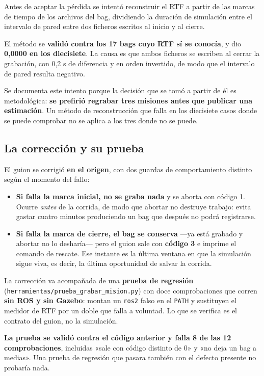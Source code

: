 \documentclass[12pt,letterpaper]{article}
\begin{document}
Antes de aceptar la pérdida se intentó reconstruir el RTF a partir de las marcas de tiempo de los archivos del bag, dividiendo la duración de simulación entre el intervalo de pared entre dos ficheros escritos al inicio y al cierre.

El método se \textbf{validó contra los 17 bags cuyo RTF sí se conocía}, y dio \textbf{0,0000 en los diecisiete}. La causa es que ambos ficheros se escriben al cerrar la grabación, con 0,2 s de diferencia y en orden invertido, de modo que el intervalo de pared resulta negativo.

Se documenta este intento porque la decisión que se tomó a partir de él es metodológica: \textbf{se prefirió regrabar tres misiones antes que publicar una estimación}. Un método de reconstrucción que falla en los diecisiete casos donde se puede comprobar no se aplica a los tres donde no se puede.

\subsection{La corrección y su prueba}

El guion se corrigió \textbf{en el origen}, con dos guardas de comportamiento distinto según el momento del fallo:

\begin{itemize}[leftmargin=*]
    \item \textbf{Si falla la marca inicial, no se graba nada} y se aborta con código 1. Ocurre \emph{antes} de la corrida, de modo que abortar no destruye trabajo: evita gastar cuatro minutos produciendo un bag que después no podrá registrarse.
    \item \textbf{Si falla la marca de cierre, el bag se conserva} ---ya está grabado y abortar no lo desharía--- pero el guion sale con \textbf{código 3} e imprime el comando de rescate. Ese instante es la última ventana en que la simulación sigue viva, es decir, la última oportunidad de salvar la corrida.
\end{itemize}

La corrección va acompañada de una \textbf{prueba de regresión} (\texttt{herramientas/prue\-ba\_grabar\_mision.py}) con doce comprobaciones que corren \textbf{sin ROS y sin Gazebo}: montan un \texttt{ros2} falso en el \texttt{PATH} y sustituyen el medidor de RTF por un doble que falla a voluntad. Lo que se verifica es el contrato del guion, no la simulación.

\textbf{La prueba se validó contra el código anterior y falla 8 de las 12 comprobaciones}, incluidas «sale con código distinto de 0» y «no deja un bag a medias». Una prueba de regresión que pasara también con el defecto presente no probaría nada.
\end{document}
